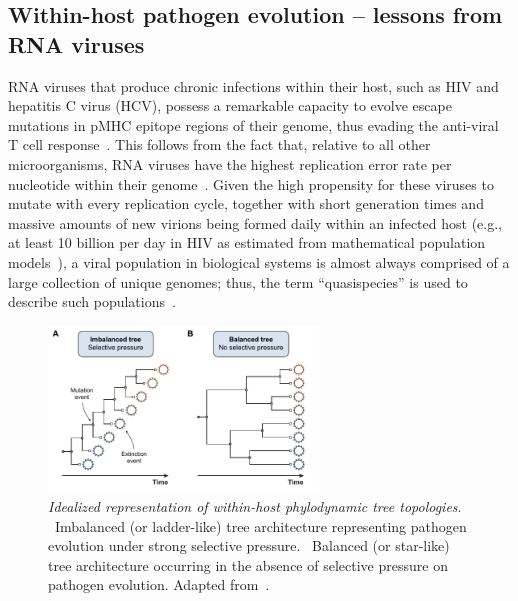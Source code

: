 \subsection{Within-host pathogen evolution -- lessons from RNA viruses}

RNA viruses that produce chronic infections within their host, such as HIV and hepatitis C virus (HCV), possess a remarkable capacity to evolve escape mutations in pMHC epitope regions of their genome, thus evading the anti-viral T cell response~\cite{weiner1995persistent,borrow1997antiviral}. This follows from the fact that, relative to all other microorganisms, RNA viruses have the highest replication error rate per nucleotide within their genome~\cite{peck2018complexities,sanjuan2016mechanisms}. Given the high propensity for these viruses to mutate with every replication cycle, together with short generation times and massive amounts of new virions being formed daily within an infected host (e.g., at least 10 billion per day in HIV as estimated from mathematical population models~\cite{perelson1996hiv,perelson2002modelling}), a viral population in biological systems is almost always comprised of a large collection of unique genomes; thus, the term ``quasispecies'' is used to describe such populations~\cite{andino2015viral,domingo2019viral,lauring2020within}.

\begin{figure}
    \centering
    \includegraphics[width=0.64\textwidth]{Figures/intro/fig9_phylodynamics.pdf}
    \caption[Idealized representation of within-host phylodynamic tree topologies]{%
    \textit{Idealized representation of within-host phylodynamic tree topologies}. %
    ~Imbalanced (or ladder-like) tree architecture representing pathogen evolution under strong selective pressure. %
    ~Balanced (or star-like) tree architecture occurring in the absence of selective pressure on pathogen evolution. Adapted from~\cite{volz2013viral}.}
    \label{fig:intro_phylodynamics}
\end{figure}


